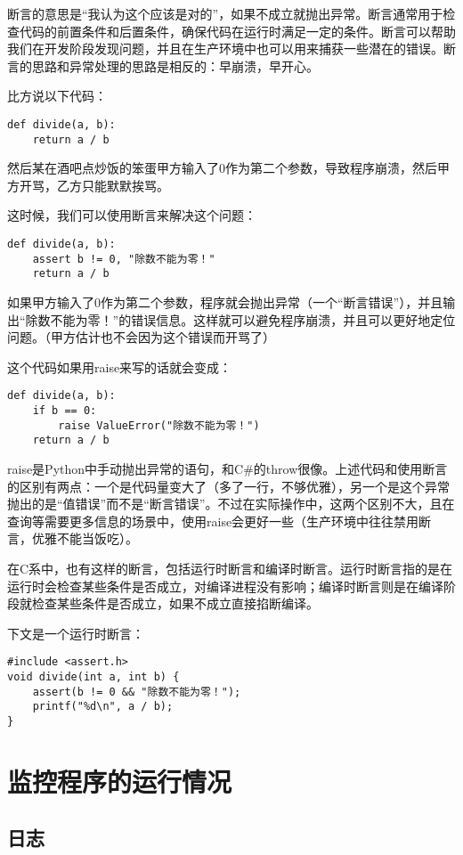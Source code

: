 \documentclass[../main.tex]{subfiles}
\begin{document}
断言的意思是“我认为这个应该是对的”，如果不成立就抛出异常。断言通常用于检查代码的前置条件和后置条件，确保代码在运行时满足一定的条件。断言可以帮助我们在开发阶段发现问题，并且在生产环境中也可以用来捕获一些潜在的错误。断言的思路和异常处理的思路是相反的：早崩溃，早开心。

比方说以下代码：

\begin{verbatim}
def divide(a, b):
    return a / b
\end{verbatim}

然后某在酒吧点炒饭的笨蛋甲方输入了0作为第二个参数，导致程序崩溃，然后甲方开骂，乙方只能默默挨骂。

这时候，我们可以使用断言来解决这个问题：
\begin{verbatim}
def divide(a, b):
    assert b != 0, "除数不能为零！"
    return a / b
\end{verbatim}

如果甲方输入了0作为第二个参数，程序就会抛出异常（一个“断言错误”），并且输出“除数不能为零！”的错误信息。这样就可以避免程序崩溃，并且可以更好地定位问题。（甲方估计也不会因为这个错误而开骂了）

这个代码如果用raise来写的话就会变成：
\begin{verbatim}
def divide(a, b):
    if b == 0:
        raise ValueError("除数不能为零！")
    return a / b
\end{verbatim}
raise是Python中手动抛出异常的语句，和C\#的throw很像。上述代码和使用断言的区别有两点：一个是代码量变大了（多了一行，不够优雅），另一个是这个异常抛出的是“值错误”而不是“断言错误”。不过在实际操作中，这两个区别不大，且在查询等需要更多信息的场景中，使用raise会更好一些（生产环境中往往禁用断言，优雅不能当饭吃）。

在C系中，也有这样的断言，包括运行时断言和编译时断言。运行时断言指的是在运行时会检查某些条件是否成立，对编译进程没有影响；编译时断言则是在编译阶段就检查某些条件是否成立，如果不成立直接掐断编译。

下文是一个运行时断言：
\begin{verbatim}
#include <assert.h>
void divide(int a, int b) {
    assert(b != 0 && "除数不能为零！");
    printf("%d\n", a / b);
}
\end{verbatim}

\section{监控程序的运行情况}\label{sec:monitoring}

\subsection{日志}\label{subsec:logging}
\end{document}
